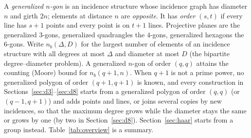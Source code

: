 \documentclass[11pt]{amsart}
\theoremstyle{definition}
\theoremstyle{remark}
\begin{document}
A \emph{generalized $n$-gon} is an incidence structure whose incidence graph has diameter $n$ and girth $2n$; elements at distance $n$ are \emph{opposite}. It has \emph{order $(s,t)$} if every line has $s+1$ points and every point is on $t+1$ lines. Projective planes are the generalized $3$-gons, generalized quadrangles the $4$-gons, generalized hexagons the $6$-gons. Write $n_b(\Delta,D)$ for the largest number of elements of an incidence structure with all degrees at most $\Delta$ and diameter at most $D$ (the bipartite degree--diameter problem). A generalized $n$-gon of order $(q,q)$ attains the counting (Moore) bound for $n_b(q+1,n)$. When $q+1$ is not a prime power, no generalized polygon of order $(q+1,q+1)$ is known, and every construction in Sections~\ref{sec:d3}--\ref{sec:d8} starts from a generalized polygon of order $(q,q)$ (or $(q-1,q+1)$) and adds points and lines, or joins several copies by new incidences, so that the maximum degree grows while the diameter stays the same or grows by one (by two in Section~\ref{sec:d8}). Section~\ref{sec:haar} starts from a group instead. Table~\ref{tab:overview} is a summary.
\end{document}
